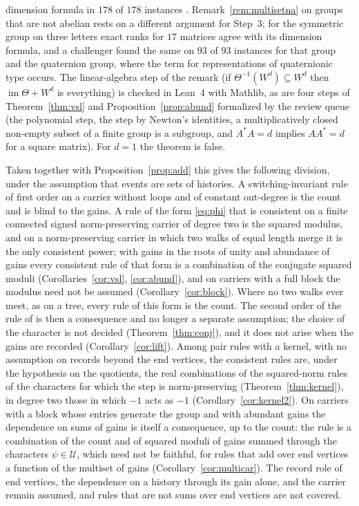 dimension formula in $178$ of $178$ instances \cite{comp4s}. Remark~\ref{rem:multisetna} on groups that are not abelian rests on a different argument for Step~3; for the symmetric group on three letters exact ranks for $17$ matrices agree with its dimension formula, and a challenger found the same on $93$ of $93$ instances for that group and the quaternion group, where the term for representations of quaternionic type occurs. The linear-algebra step of the remark (if $\Theta^{-1}(W^d)\subseteq W^d$ then $\operatorname{im}\Theta+W^d$ is everything) is checked in Lean~4 with Mathlib, as are four steps of Theorem~\ref{thm:vsl} and Proposition~\ref{prop:abund} formalized by the review queue (the polynomial step, the step by Newton's identities, a multiplicatively closed non-empty subset of a finite group is a subgroup, and $A^*A=d$ implies $AA^*=d$ for a square matrix). For $d=1$ the theorem is false.

Taken together with Proposition~\ref{prop:add} this gives the following division, under the assumption that events are sets of histories. A switching-invariant rule of first order on a carrier without loops and of constant out-degree is the count and is blind to the gains. A rule of the form \eqref{eq:phi} that is consistent on a finite connected signed norm-preserving carrier of degree two is the squared modulus, and on a norm-preserving carrier in which two walks of equal length merge it is the only consistent power; with gains in the roots of unity and abundance of gains every consistent rule of that form is a combination of the conjugate squared moduli (Corollaries~\ref{cor:vsl}, \ref{cor:abund}), and on carriers with a full block the modulus need not be assumed (Corollary~\ref{cor:block}). Where no two walks ever meet, as on a tree, every rule of this form is the count. The second order of the rule of \cite{g8} is then a consequence and no longer a separate assumption; the choice of the character is not decided (Theorem~\ref{thm:conj}), and it does not arise when the gains are recorded (Corollary~\ref{cor:lift}). Among pair rules with a kernel, with no assumption on records beyond the end vertices, the consistent rules are, under the hypothesis on the quotients, the real combinations of the squared-norm rules of the characters for which the step is norm-preserving (Theorem~\ref{thm:kernel}), in degree two those in which $-1$ acts as $-1$ (Corollary~\ref{cor:kernel2}). On carriers with a block whose entries generate the group and with abundant gains the dependence on sums of gains is itself a consequence, up to the count: the rule is a combination of the count and of squared moduli of gains summed through the characters $\psi\in\mathcal{U}$, which need not be faithful, for rules that add over end vertices a function of the multiset of gains (Corollary~\ref{cor:multicar}). The record role of end vertices, the dependence on a history through its gain alone, and the carrier remain assumed, and rules that are not sums over end vertices are not covered.

